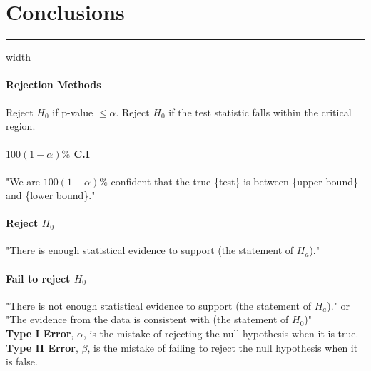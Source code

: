 \documentclass[10pt]{article}
\begin{document}
\section*{Conclusions}
\hrule width \textwidth
\vspace{6pt}
\paragraph{Rejection Methods} Reject $H_0$ if p-value $\leq \alpha$. Reject $H_0$ if the test statistic falls within the critical region.
\paragraph{$100(1-\alpha)\%$ C.I} "We are $100(1-\alpha)\%$ confident that the true \{test\} is between \{upper bound\} and \{lower bound\}."
\paragraph{Reject $H_0$} "There is enough statistical evidence to support (the statement of $H_a$)."
\paragraph{Fail to reject $H_0$} "There is not enough statistical evidence to support (the statement of $H_a$)."
or "The evidence from the data is consistent with (the statement of $H_0$)"\\
\textbf{Type I Error}, $\alpha$, is the mistake of rejecting
the null hypothesis when it is true.\\
\textbf{Type II Error}, $\beta$, is the mistake of failing to
reject the null hypothesis when it is false.


\end{document}
